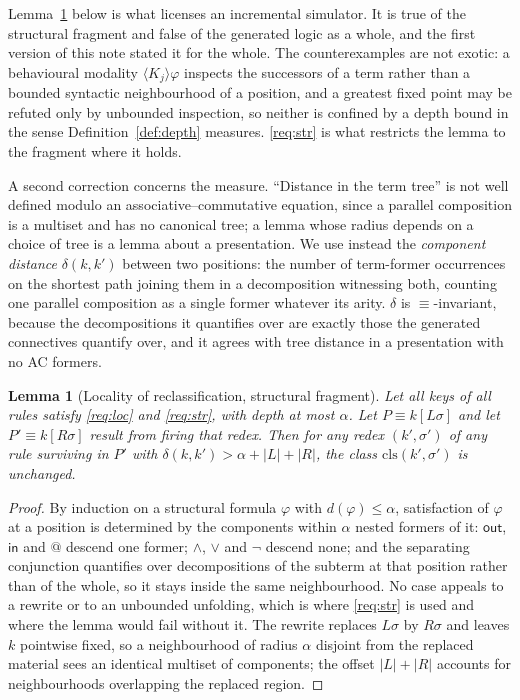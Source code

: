 \documentclass[11pt,a4paper]{article}
\theoremstyle{plain}
\newtheorem{lemma}[theorem]{Lemma}
\theoremstyle{definition}
\theoremstyle{remark}
\newcommand{\out}{\mathsf{out}}
\newcommand{\inn}{\mathsf{in}}
\newcommand{\dpt}{d}
\newcommand{\class}{\mathrm{cls}}
\begin{document}
Lemma~\ref{lem:locality} below is what licenses an incremental simulator. It is true of the
structural fragment and false of the generated logic as a whole, and the first version of this note
stated it for the whole. The counterexamples are not exotic: a behavioural modality
$\langle K_j\rangle\varphi$ inspects the successors of a term rather than a bounded syntactic
neighbourhood of a position, and a greatest fixed point may be refuted only by unbounded inspection,
so neither is confined by a depth bound in the sense Definition~\ref{def:depth} measures.
\ref{req:str} is what restricts the lemma to the fragment where it holds.

A second correction concerns the measure. ``Distance in the term tree'' is not well defined modulo an
associative--commutative equation, since a parallel composition is a multiset and has no canonical
tree; a lemma whose radius depends on a choice of tree is a lemma about a presentation. We use
instead the \emph{component distance} $\delta(k,k')$ between two positions: the number of term-former
occurrences on the shortest path joining them in a decomposition witnessing both, counting one
parallel composition as a single former whatever its arity. $\delta$ is $\equiv$-invariant, because
the decompositions it quantifies over are exactly those the generated connectives quantify over, and
it agrees with tree distance in a presentation with no AC formers.

\begin{lemma}[Locality of reclassification, structural fragment]
\label{lem:locality}
Let all keys of all rules satisfy \ref{req:loc} and \ref{req:str}, with depth at most $\alpha$. Let
$P \equiv k[L\sigma]$ and let $P' \equiv k[R\sigma]$ result from firing that redex. Then for any
redex $(k', \sigma')$ of any rule surviving in $P'$ with
$\delta(k,k') > \alpha + |L| + |R|$, the class $\class(k',\sigma')$ is unchanged.
\end{lemma}

\begin{proof}
By induction on a structural formula $\varphi$ with $\dpt(\varphi) \le \alpha$, satisfaction of
$\varphi$ at a position is determined by the components within $\alpha$ nested formers of it:
$\out$, $\inn$ and $@$ descend one former; $\wedge$, $\vee$ and $\neg$ descend none; and the
separating conjunction quantifies over decompositions of the subterm at that position rather than of
the whole, so it stays inside the same neighbourhood. No case appeals to a rewrite or to an unbounded
unfolding, which is where \ref{req:str} is used and where the lemma would fail without it. The
rewrite replaces $L\sigma$ by $R\sigma$ and leaves $k$ pointwise fixed, so a neighbourhood of radius
$\alpha$ disjoint from the replaced material sees an identical multiset of components; the offset
$|L| + |R|$ accounts for neighbourhoods overlapping the replaced region.
\end{proof}
\end{document}
